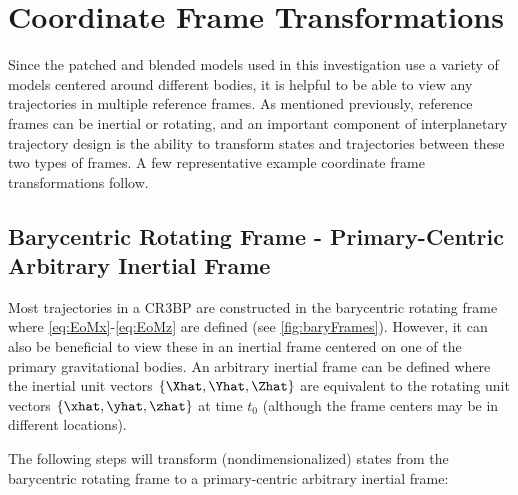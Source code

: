 \section{Coordinate Frame Transformations}
Since the patched and blended models used in this investigation use a variety of models centered
around different bodies, it is helpful to be able to view any trajectories in multiple reference
frames. As mentioned previously, reference frames can be inertial or rotating, and an important
component of interplanetary trajectory design is the ability to transform states and trajectories
between these two types of frames. A few representative example coordinate frame transformations
follow.

\subsection{Barycentric Rotating Frame - Primary-Centric Arbitrary Inertial Frame}
Most trajectories in a CR3BP are constructed in the barycentric rotating frame where
\cref{eq:EoMx}-\cref{eq:EoMz} are defined (see \cref{fig:baryFrames}). However, it can also be
beneficial to view these in an inertial frame centered on one of the primary gravitational bodies.
An arbitrary inertial frame can be defined where the inertial unit vectors $\{\Xhat,\Yhat,\Zhat\}$
are equivalent to the rotating unit vectors $\{\xhat,\yhat,\zhat\}$ at time $t_{0}$ (although the
frame centers may be in different locations).

The following steps will transform (nondimensionalized) states from the barycentric rotating frame
to a primary-centric arbitrary inertial frame:


